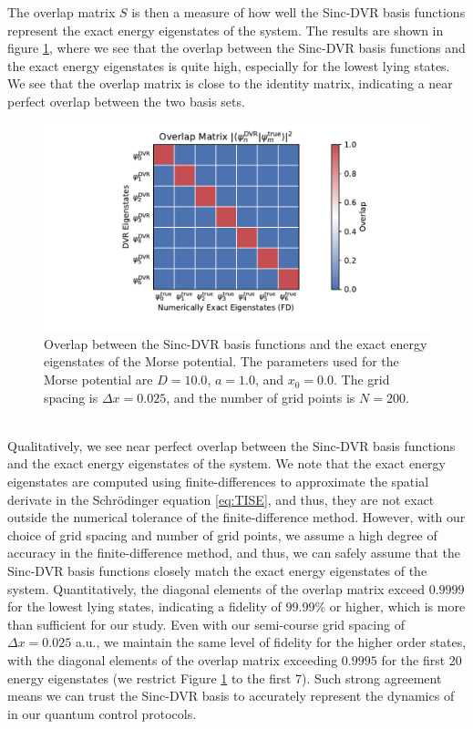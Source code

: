 \documentclass{subfiles}
\begin{document}
The overlap matrix $S$ is then a measure of how well the Sinc-DVR basis functions represent the exact energy eigenstates of the system. The results are shown in figure \ref{fig:dvr_validation_overlap}, where we see that the overlap between the Sinc-DVR basis functions and the exact energy eigenstates is quite high, especially for the lowest lying states. We see that the overlap matrix is close to the identity matrix, indicating a near perfect overlap between the two basis sets.
\begin{figure}[h!]
    \centering
    \includegraphics[width=\textwidth]{figs/dvr_validation_overlap.pdf}
    \caption{Overlap between the Sinc-DVR basis functions and the exact energy eigenstates of the Morse potential. The parameters used for the Morse potential are $D = 10.0$, $a = 1.0$, and $x_0 = 0.0$. The grid spacing is $\Delta x = 0.025$, and the number of grid points is $N = 200$.}
    \label{fig:dvr_validation_overlap}
\end{figure}
\\
Qualitatively, we see near perfect overlap between the Sinc-DVR basis functions and the exact energy eigenstates of the system. We note that the exact energy eigenstates are computed using finite-differences to approximate the spatial derivate in the Schrödinger equation \eqref{eq:TISE}, and thus, they are not exact outside the numerical tolerance of the finite-difference method. However, with our choice of grid spacing and number of grid points, we assume a high degree of accuracy in the finite-difference method, and thus, we can safely assume that the Sinc-DVR basis functions closely match the exact energy eigenstates of the system. Quantitatively, the diagonal elements of the overlap matrix exceed $0.9999$ for the lowest lying states, indicating a fidelity of $99.99\%$ or higher, which is more than sufficient for our study.  Even with our semi-course grid spacing of $\Delta x = 0.025$ a.u., we maintain the same level of fidelity for the higher order states, with the diagonal elements of the overlap matrix exceeding $0.9995$ for the first 20 energy eigenstates (we restrict Figure \ref{fig:dvr_validation_overlap} to the first 7). Such strong agreement means we can trust the Sinc-DVR basis to accurately represent the dynamics of in our quantum control protocols. 
\end{document}
